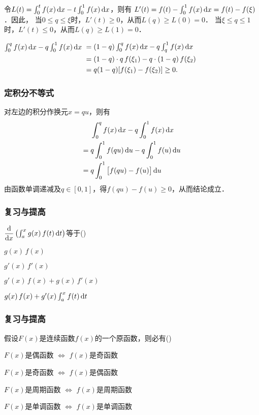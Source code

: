 \documentclass[14pt,notheorems,leqno,xcolor={rgb}]{beamer} %
\begin{document}
\begin{sframe}
\begin{solution}[方法1]
令$L(t)=\int_0^t f(x)\mathop{}\!\mathrm{d} x - t\int_0^1 f(x)\mathop{}\!\mathrm{d} x$，则有
$L'(t)=f(t)-\int_0^1 f(x)\mathop{}\!\mathrm{d} x=f(t)-f(\xi)$．因此，
当$0\le q\le\xi$时，$L'(t)\ge0$，从而$L(q)\ge L(0)=0$．
当$\xi\le q\le1$时，$L'(t)\le0$，从而$L(q)\ge L(1)=0$．
\end{solution}
\vpause
\begin{solution}[方法2]
$\int_0^q f(x)\mathop{}\!\mathrm{d} x - q\int_0^1 f(x)\mathop{}\!\mathrm{d} x$\newline
$\!\!\begin{aligned}[t]
&\textstyle=(1-q)\int_0^q f(x)\mathop{}\!\mathrm{d} x - q\int_q^1 f(x)\mathop{}\!\mathrm{d} x \\
&=(1-q)\cdot q\,f(\xi_1) - q\cdot (1-q)\,f(\xi_2) \\
&=q(1-q)[f(\xi_1)-f(\xi_2)]\ge 0.
\end{aligned}$
\end{solution}
\end{sframe}

\begin{sframe}
\frametitle{定积分不等式}
\begin{solution}[方法3]
对左边的积分作换元$x=qu$，则有
\begin{align*}
   & \int_0^q f(x)\mathop{}\!\mathrm{d} x - q\int_0^1 f(x)\mathop{}\!\mathrm{d} x \\
={}& q\int_0^1 f(qu)\mathop{}\!\mathrm{d} u - q\int_0^1 f(u)\mathop{}\!\mathrm{d} u \\
={}& q\int_0^1 \big[f(qu)-f(u)\big]\mathop{}\!\mathrm{d} u
\end{align*}
由函数单调递减及$q\in[0,1]$，得$f(qu)-f(u)\ge0$，从而结论成立．
\end{solution}
\end{sframe}

\begin{frame}
\frametitle{复习与提高}
\begin{choice}
$\dfrac{\mathop{}\!\mathrm{d}}{\mathop{}\!\mathrm{d} x}\left(\int_a^x g(x)\,f(t)\mathop{}\!\mathrm{d} t\right)$等于\dotfill(\qquad)
\begin{choiceline}
  \item $g(x)\,f(x)$
  \item $g'(x)\,f'(x)$
  \item $g'(x)\,f(x)+g(x)\,f'(x)$
  \item $g(x)\,f(x)+g'(x)\int_a^x f(t)\mathop{}\!\mathrm{d} t$
\end{choiceline}
\end{choice}
\end{frame}

\begin{frame}
\frametitle{复习与提高}
\begin{choice}
假设$F(x)$是连续函数$f(x)$的一个原函数，则必有\dotfill(\qquad)
\begin{choiceline}
  \item $F(x)$是偶函数 $\Leftrightarrow$ $f(x)$是奇函数
  \item $F(x)$是奇函数 $\Leftrightarrow$ $f(x)$是偶函数
  \item $F(x)$是周期函数 $\Leftrightarrow$ $f(x)$是周期函数
  \item $F(x)$是单调函数 $\Leftrightarrow$ $f(x)$是单调函数
\end{choiceline}
\end{choice}
\end{frame}
\end{document}
